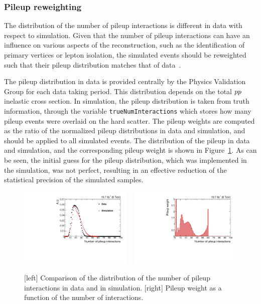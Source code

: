 
\subsubsection{Pileup reweighting \label{sec:event_pileup}}

The distribution of the number of pileup interactions is different in data with respect to
simulation. Given that the number of pileup interactions can have an influence on various aspects of
the reconstruction, such as the identification of primary vertices or lepton isolation, 
the simulated events should be reweighted such that their pileup distribution matches that of
data~\cite{pileup_twiki}.

The pileup distribution in data is provided centrally by the Physics Validation Group for each
data taking period. This distribution depends on the total ${p}{p}$ inelastic cross section. 
In simulation, the pileup distribution is taken from truth information, through the variable
\texttt{trueNumInteractions} which stores how many pileup events were overlaid on the hard scatter. 
The pileup weights are computed as the ratio of the normalized pileup distributions in data and
simulation, and should be applied to all simulated events.
The distribution of the pileup in data and simulation, and the corresponding pileup weight is
shown in Figure~\ref{fig:pileup_comparison}. As can be seen, the initial guess for the pileup
distribution, which was implemented in the simulation, was not perfect, resulting in an effective
reduction of the statistical precision of the simulated samples. 

\begin{figure}[htpb]
 \centering
 \includegraphics[width=0.48\textwidth]{figures/eventreco_reweighting/pileup_comparison}
 ~
 \includegraphics[width=0.48\textwidth]{figures/eventreco_reweighting/pileup_weight_comparison}
\caption{[left] Comparison of the distribution of the number of pileup interactions in data and in
simulation. 
[right] Pileup weight as a function of the number of interactions. 
\label{fig:pileup_comparison}}
\end{figure}

